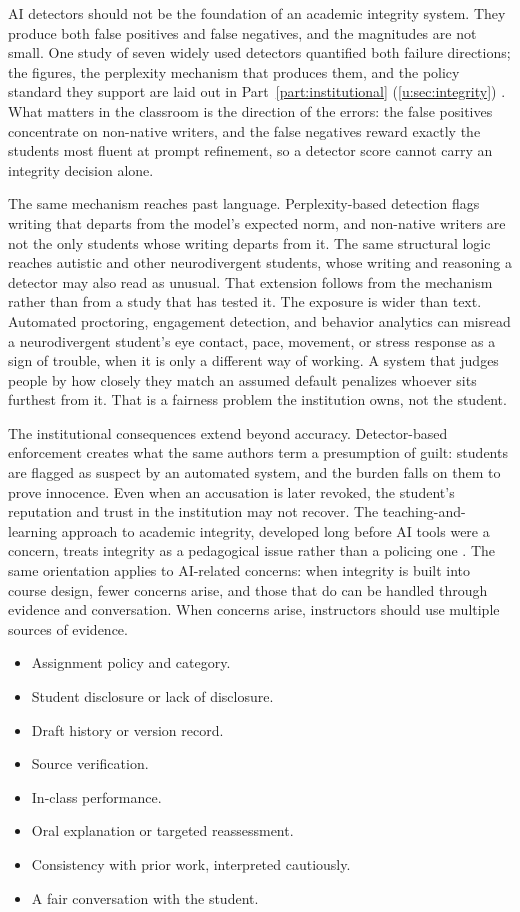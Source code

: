 \documentclass{SIAMbook2023}
\begin{document}
AI detectors should not be the foundation of an academic integrity system. They produce both false positives and false negatives, and the magnitudes are not small. One study of seven widely used detectors quantified both failure directions; the figures, the perplexity mechanism that produces them, and the policy standard they support are laid out in Part~\ref{part:institutional} (\cref{u:sec:integrity}) \citep{liang2023gpt}. What matters in the classroom is the direction of the errors: the false positives concentrate on non-native writers, and the false negatives reward exactly the students most fluent at prompt refinement, so a detector score cannot carry an integrity decision alone.

The same mechanism reaches past language. Perplexity-based detection flags writing that departs from the model's expected norm, and non-native writers are not the only students whose writing departs from it. The same structural logic reaches autistic and other neurodivergent students, whose writing and reasoning a detector may also read as unusual. That extension follows from the mechanism rather than from a study that has tested it. The exposure is wider than text. Automated proctoring, engagement detection, and behavior analytics can misread a neurodivergent student's eye contact, pace, movement, or stress response as a sign of trouble, when it is only a different way of working. A system that judges people by how closely they match an assumed default penalizes whoever sits furthest from it. That is a fairness problem the institution owns, not the student.

The institutional consequences extend beyond accuracy. Detector-based enforcement creates what the same authors term a presumption of guilt: students are flagged as suspect by an automated system, and the burden falls on them to prove innocence. Even when an accusation is later revoked, the student's reputation and trust in the institution may not recover. The teaching-and-learning approach to academic integrity, developed long before AI tools were a concern, treats integrity as a pedagogical issue rather than a policing one \citep{bertramgallant2017academic}. The same orientation applies to AI-related concerns: when integrity is built into course design, fewer concerns arise, and those that do can be handled through evidence and conversation. When concerns arise, instructors should use multiple sources of evidence.

\begin{itemize}
\item Assignment policy and category.
\item Student disclosure or lack of disclosure.
\item Draft history or version record.
\item Source verification.
\item In-class performance.
\item Oral explanation or targeted reassessment.
\item Consistency with prior work, interpreted cautiously.
\item A fair conversation with the student.
\end{itemize}
\end{document}
